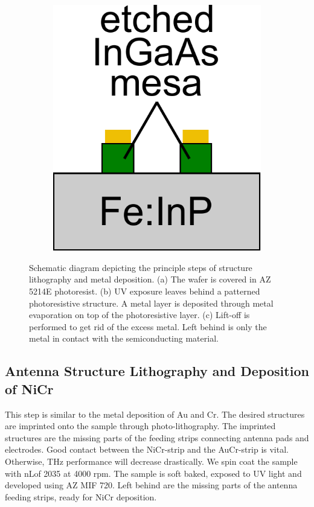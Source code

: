 \begin{figure}[h]
\begin{subfigure}[b]{0.225\textwidth}
        \caption{}
        \label{fig:fab22}
    \end{subfigure}
    \hfill
    \begin{subfigure}[b]{0.225\textwidth}
        \centering
        \includegraphics[width=\textwidth]{figures/Fabrication/fab2_3.pdf}
        \caption{}
        \label{fig:fab23}
    \end{subfigure}
    \caption{Schematic diagram depicting the principle steps of structure lithography and metal deposition. (a) The wafer is covered in AZ 5214E photoresist. (b) UV exposure leaves behind a patterned photoresistive structure. A metal layer is deposited through metal evaporation on top of the photoresistive layer. (c) Lift-off is performed to get rid of the excess metal. Left behind is only the metal in contact with the semiconducting material.}
\end{figure}


\subsection{Antenna Structure Lithography and Deposition of NiCr}
This step is similar to the metal deposition of Au and Cr. The desired structures are imprinted onto the sample through photo-lithography. The imprinted structures are the missing parts of the feeding strips connecting antenna pads and electrodes. Good contact between the NiCr-strip and the AuCr-strip is vital. Otherwise, THz performance will decrease drastically. We spin coat the sample with nLof 2035 at \num{4000} rpm. The sample is soft baked, exposed to UV light and developed using AZ MIF 720. Left behind are the missing parts of the antenna feeding strips, ready for NiCr deposition.


